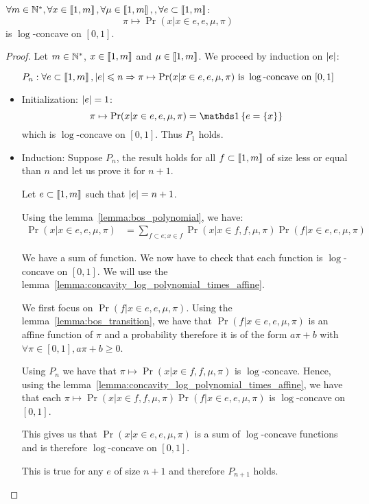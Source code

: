 \begin{lemma}
    \label{lemma:log_concavity_bos_model}
    $\forall m \in \mathbb{N}^*, \forall x \in \left\llbracket1, m\right\rrbracket, \forall \mu \in \left\llbracket1, m\right\rrbracket,, \forall e \subset \left\llbracket1, m\right\rrbracket$:
    \[ \pi \mapsto \Pr(x | x \in e, e, \mu, \pi) \]
    is $\log$-concave on $[0, 1]$.
\end{lemma}
\begin{proof}
    Let $m \in \mathbb{N}^*$, $x \in \left\llbracket1, m\right\rrbracket$ and $\mu \in \left\llbracket1, m\right\rrbracket$.
    We proceed by induction on $\left|e\right|$:

    \[ P_n : \forall e \subset \left\llbracket1, m\right\rrbracket, |e| \leqslant n \Rightarrow \pi \mapsto \Pr(x | x \in e, e, \mu, \pi) \text{ is } \log\text{-concave on } [0, 1] \]

    \begin{itemize}
        \item Initialization: $\left|e\right| = 1$:
        \[\pi \mapsto \Pr(x | x \in e, e, \mu, \pi) = \indickronecker{e = \set{x}} \] which is $\log$-concave on $[0, 1]$.
        Thus $P_1$ holds.

        \item Induction: Suppose $P_n$, the result holds for all $f \subset \left\llbracket1, m\right\rrbracket$ of size less or equal than $n$ and let us prove it for $n+1$.
        
        Let $e \subset \left\llbracket1, m\right\rrbracket$ such that $\left|e\right| = n + 1$.

        Using the lemma~\ref{lemma:bos_polynomial}, we have:
        \begin{align}
            \Pr(x | x \in e, e, \mu, \pi) 
            &= \sum_{f \subset e ; x \in f} \Pr(x | x \in f, f, \mu, \pi) \Pr(f | x \in e, e, \mu, \pi)
        \end{align}

        We have a sum of function. We now have to check that each function is $\log$-concave on $[0, 1]$. We will use the lemma~\ref{lemma:concavity_log_polynomial_times_affine}. 
        
        We first focus on $\Pr(f | x \in e, e, \mu, \pi)$.
        Using the lemma~\ref{lemma:bos_transition}, we have that  $\Pr(f | x \in e, e, \mu, \pi)$ is an affine function of $\pi$ and a probability therefore it is of the form $a \pi + b$ with $\forall \pi \in [0, 1], a \pi + b \geq 0$. 
        
        Using $P_n$ we have that $\pi \mapsto \Pr(x | x \in f, f, \mu, \pi)$ is $\log$-concave. Hence, using the lemma~\ref{lemma:concavity_log_polynomial_times_affine}, we have that each $\pi \mapsto \Pr(x | x \in f, f, \mu, \pi) \Pr(f | x \in e, e, \mu, \pi)$ is $\log$-concave on $[0, 1]$.
        
        This gives us that $\Pr(x | x \in e, e, \mu, \pi)$ is a sum of $\log$-concave functions and is therefore $\log$-concave on $[0, 1]$.

        This is true for any $e$ of size $n + 1$ and therefore $P_{n+1}$ holds.
        
    \end{itemize}

\end{proof}


